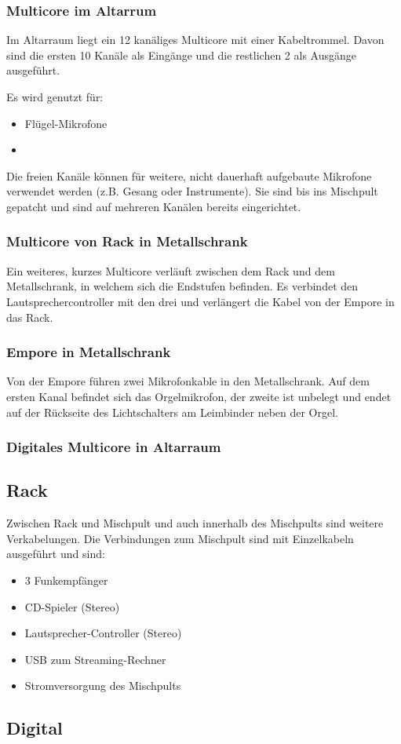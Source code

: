 			\subsubsection{Multicore im Altarrum}\label{kabel:ton:multicore_altarraum}
				Im Altarraum liegt ein 12 kanäliges Multicore mit einer Kabeltrommel.
				Davon sind die ersten 10 Kanäle als Eingänge und die restlichen 2 als Ausgänge ausgeführt.

				Es wird genutzt für:
				\begin{itemize}
					\item Flügel-Mikrofone
					\item {}
				\end{itemize}

				Die freien Kanäle können für weitere, nicht dauerhaft aufgebaute Mikrofone verwendet werden (z.B. Gesang oder Instrumente).
				Sie sind bis ins Mischpult gepatcht und sind auf mehreren Kanälen bereits eingerichtet.
			\subsubsection{Multicore von Rack in Metallschrank}
				Ein weiteres, kurzes Multicore verläuft zwischen dem Rack und dem Metallschrank, in welchem sich die Endstufen befinden.
				Es verbindet den \Gls{Lautsprechercontroller} mit den drei  und verlängert die Kabel von der Empore in das Rack.
			\subsubsection{Empore in Metallschrank}
				Von der Empore führen zwei Mikrofonkable in den Metallschrank.
				Auf dem ersten Kanal befindet sich das Orgelmikrofon, der zweite ist unbelegt und endet auf der Rückseite des Lichtschalters am Leimbinder neben der Orgel.
			\subsubsection{Digitales Multicore in Altarraum}\label{kabel:ton:digitales_multicore}
		\subsection{Rack}
				Zwischen Rack und Mischpult und auch innerhalb des Mischpults sind weitere Verkabelungen.
				Die Verbindungen zum Mischpult sind mit Einzelkabeln ausgeführt und sind:
				\begin{itemize}
					\item 3 Funkempfänger
					\item CD-Spieler (Stereo)
					\item Lautsprecher-Controller (Stereo)
					\item USB zum Streaming-Rechner
					\item Stromversorgung des Mischpults
				\end{itemize}
		\subsection{Digital}
		